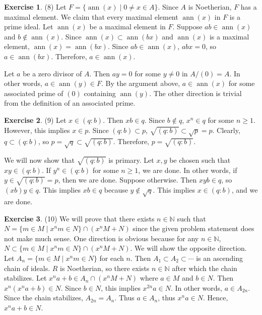 \documentclass[12pt, psamsfonts]{amsart}
\theoremstyle{definition}
\newtheorem*{exer}{Exercise}
\theoremstyle{remark}
\DeclareMathOperator{\ann}{ann}
\numberwithin{equation}{section}
\begin{document}
\begin{exer}{(8)}
  Let $F = \{ \ann(x) \mid 0 \ne x \in A \}$.
  Since $A$ is Noetherian, $F$ has a maximal element.
  We claim that every maximal element $\ann(x)$ in $F$ is a prime ideal.
  Let $\ann(x)$ be a maximal element in $F$.
  Suppose $ab \in \ann(x)$ and $b \notin \ann(x)$.
  Since $\ann(x) \subset \ann(bx)$ and $\ann(x)$ is a maximal element, $\ann(x) = \ann(bx)$.
  Since $ab \in \ann(x)$, $abx = 0$, so $a \in \ann(bx)$.
  Therefore, $a \in \ann(x)$.

  Let $a$ be a zero divisor of $A$.
  Then $ay = 0$ for some $y \ne 0$ in $A / (0) = A$.
  In other words, $a \in \ann(y) \in F$.
  By the argument above, $a \in \ann(x)$ for some associated prime of $(0)$ containing $\ann(y)$.
  The other direction is trivial from the definition of an associated prime.
\end{exer}

\begin{exer}{(9)}
  Let $x \in (q:b)$.
  Then $xb \in q$.
  Since $b \notin q$, $x^n \in q$ for some $n \geq 1$.
  However, this implies $x \in p$.
  Since $(q:b) \subset p$, $\sqrt{(q:b)} \subset \sqrt{p} = p$.
  Clearly, $q \subset (q:b)$, so $p = \sqrt{q} \subset \sqrt{(q:b)}$.
  Therefore, $p = \sqrt{(q:b)}$.

  We will now show that $\sqrt{(q:b)}$ is primary.
  Let $x, y$ be chosen such that $xy \in (q:b)$.
  If $y^n \in (q:b)$ for some $n \geq 1$, we are done.
  In other words, if $y \in \sqrt{(q:b)} = p$, then we are done.
  Suppose otherwise.
  Then $xyb \in q$, so $(xb)y \in q$.
  This implies $xb \in q$ because $y \notin \sqrt{q}$.
  This implies $x \in (q:b)$, and we are done.
\end{exer}

\begin{exer}{(10)}
  We will prove that there exists $n \in \mathbb{N}$ such that $N = \{ m \in M \mid x^nm \in N \} \cap (x^nM + N)$ since the given problem statement does not make much sense.
  One direction is obvious because for any $n \in \mathbb{N}$, $N \subset \{ m \in M \mid x^nm \in N \} \cap (x^nM + N)$.
  We will show the opposite direction.
  Let $A_n = \{ m \in M \mid x^nm \in N \}$ for each $n$.
  Then $A_1 \subset A_2 \subset \cdots$ is an ascending chain of ideals.
  $R$ is Noetherian, so there exists $n \in \mathbb{N}$ after which the chain stabilizes.
  Let $x^na + b \in A_n \cap (x^nM + N)$ where $a \in M$ and $b \in N$.
  Then $x^n(x^na + b) \in N$.
  Since $b \in N$, this implies $x^{2n}a \in N$.
  In other words, $a \in A_{2n}$.
  Since the chain stabilizes, $A_{2n} = A_n$.
  Thus $a \in A_n$, thus $x^na \in N$.
  Hence, $x^na + b \in N$.
\end{exer}
\end{document}
